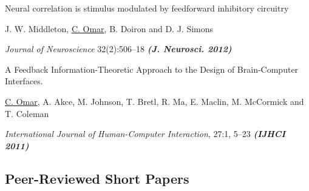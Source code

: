 \documentclass[10pt,letterpaper]{article}
\renewenvironment{itemize}{
  \begin{list}{}{
    \setlength{\leftmargin}{1.5em}
    \setlength{\itemsep}{0.25em}
    \setlength{\parskip}{0pt}
    \setlength{\parsep}{0.25em}
  }
}{
  \end{list}
}
\begin{document}
\begin{enumerate}
\begin{itemize}
  \end{itemize}
\item {Neural correlation is stimulus modulated by feedforward inhibitory circuitry}
  \begin{itemize}
    \item J. W. Middleton, \underline{C. Omar}, B. Doiron and D. J. Simons
    \item \textit{Journal of Neuroscience} 32(2):506--18 \textit{\textbf{(J. Neurosci. 2012)}}
  \end{itemize}
\item A Feedback Information-Theoretic Approach to the Design of Brain-Computer Interfaces.
  \begin{itemize}
    \item  \underline{C. Omar}, A. Akce, M. Johnson, T. Bretl, R. Ma, E. Maclin, M. McCormick and T. Coleman
    \item \textit{International Journal of Human-Computer Interaction}, 27:1, 5--23 \textit{\textbf{(IJHCI 2011)}}
  \end{itemize}
\end{enumerate}

\subsection*{Peer-Reviewed Short Papers}
\end{document}
